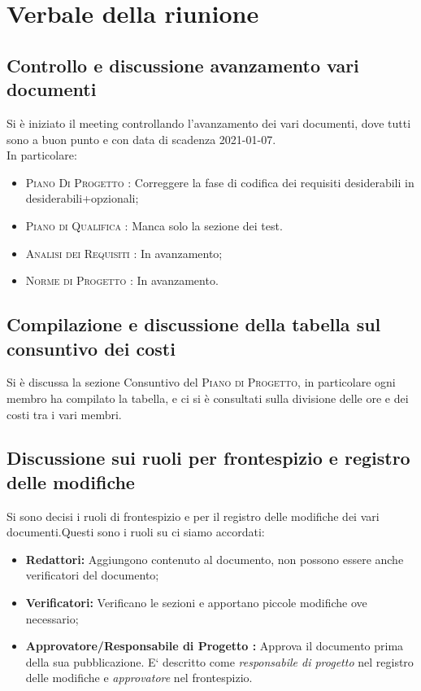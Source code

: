 \section{Verbale della riunione}
\subsection{Controllo e discussione avanzamento vari documenti}
Si è iniziato il meeting controllando l'avanzamento dei vari documenti, dove tutti sono a buon punto e con data di scadenza 2021-01-07.\\
In particolare:
\begin{itemize}
	\item \textsc{Piano Di Progetto :} Correggere la fase di codifica dei requisiti desiderabili in desiderabili+opzionali;
	\item \textsc{Piano di Qualifica :} Manca solo la sezione dei test.
	\item \textsc{Analisi dei Requisiti :} In avanzamento;
	\item \textsc{Norme di Progetto :} In avanzamento.
\end{itemize}

\subsection{Compilazione e discussione della tabella sul consuntivo dei costi}
Si è discussa la sezione Consuntivo del \textsc{Piano di Progetto}, in particolare ogni membro ha compilato la tabella, e ci si è consultati sulla divisione delle ore e dei costi tra i vari membri.

\subsection{Discussione sui ruoli per frontespizio e registro delle modifiche}
Si sono decisi i ruoli di frontespizio e per il registro delle modifiche dei vari documenti.\newline Questi sono i ruoli su ci siamo accordati:
\begin{itemize}
	\item \textbf{Redattori:} Aggiungono contenuto al documento, non possono essere anche verificatori del documento;
	\item \textbf{Verificatori:} Verificano le sezioni e apportano piccole modifiche ove necessario;
	\item \textbf{Approvatore/Responsabile di Progetto :} Approva il documento prima della sua pubblicazione. E` descritto come \textit{responsabile di progetto} nel registro delle modifiche e \textit{approvatore} nel frontespizio.
\end{itemize}

